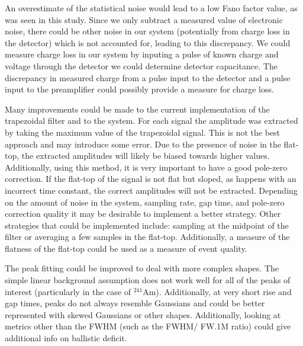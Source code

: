 An overestimate of the statistical noise would lead to a low Fano factor value, as was seen in this study. Since we only subtract a measured value of electronic noise, there could be other noise in our system (potentially from charge loss in the detector) which is not accounted for, leading to this discrepancy. We could measure charge loss in our system by inputing a pulse of known charge and voltage through the detector we could determine detector capacitance. The discrepancy in measured charge from a pulse input to the detector and a pulse input to the preamplifier could possibly provide a measure for charge loss.

Many improvements could be made to the current implementation of the trapezoidal filter and to the system. For each signal the amplitude was extracted by taking the maximum value of the trapezoidal signal. This is not the best approach and may introduce some error. Due to the presence of noise in the flat-top, the extracted amplitudes will likely be biased towards higher values. Additionally, using this method, it is very important to have a good pole-zero correction. If the flat-top of the signal is not flat but sloped, as happens with an incorrect time constant, the correct amplitudes will not be extracted. Depending on the amount of noise in the system, sampling rate, gap time, and pole-zero correction quality it may be desirable to implement a better strategy. Other strategies that could be implemented include: sampling at the midpoint of the filter or averaging a few samples in the flat-top. Additionally, a measure of the flatness of the flat-top could be used as a measure of event quality.

The peak fitting could be improved to deal with more complex shapes. The simple linear background assumption does not work well for all of the peaks of interest (particularly in the case of  ${}^{241}$Am). Additionally, at very short rise and gap times, peaks do not always resemble Gaussians and could be better represented with skewed Gaussians or other shapes. Additionally, looking at metrics other than the FWHM (such as the FWHM/ FW.1M ratio) could give additional info on ballistic deficit.
